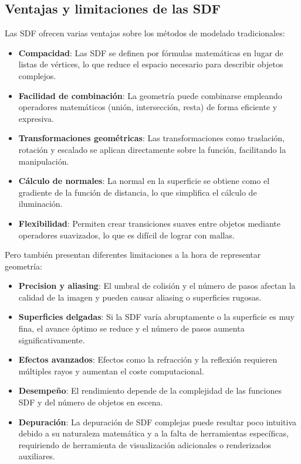 \subsection{Ventajas y limitaciones de las SDF}

Las SDF ofrecen varias ventajas sobre los métodos de modelado tradicionales:

\begin{itemize}
    \item \textbf{Compacidad}: Las SDF se definen por fórmulas matemáticas en lugar de listas de vértices, lo que reduce el espacio necesario para describir objetos complejos.
    \item \textbf{Facilidad de combinación}: La geometría puede combinarse empleando operadores matemáticos (unión, intersección, resta) de forma eficiente y expresiva.
    \item \textbf{Transformaciones geométricas}: Las transformaciones como traslación, rotación y escalado se aplican directamente sobre la función, facilitando la manipulación.
    \item \textbf{Cálculo de normales}: La normal en la superficie se obtiene como el gradiente de la función de distancia, lo que simplifica el cálculo de iluminación.
    \item \textbf{Flexibilidad}: Permiten crear transiciones suaves entre objetos mediante operadores suavizados, lo que es difícil de lograr con mallas.
\end{itemize}

Pero también presentan diferentes limitaciones a la hora de representar
geometría:

\begin{itemize}
\item \textbf{Precision y aliasing}: El umbral de colisión y el número de pasos afectan la calidad de la imagen y pueden causar aliasing o superficies rugosas.
\item \textbf{Superficies delgadas}: Si la SDF varía abruptamente o la superficie es muy fina, el avance óptimo se reduce y el número de pasos aumenta significativamente.
\item \textbf{Efectos avanzados}: Efectos como la refracción y la reflexión requieren múltiples rayos y aumentan el coste computacional.
\item \textbf{Desempeño}: El rendimiento depende de la complejidad de las funciones SDF y del número de objetos en escena.
\item \textbf{Depuración}: La depuración de SDF complejas puede resultar poco intuitiva debido a su naturaleza matemática y a la falta de herramientas específicas, requiriendo de herramienta de visualización adicionales o renderizados auxiliares.
\end{itemize}

